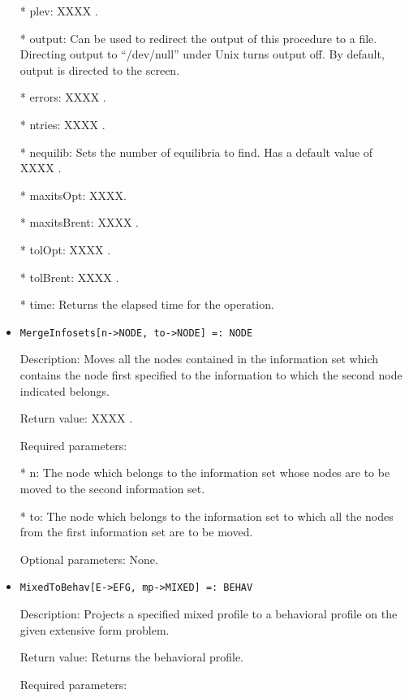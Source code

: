 \begin{itemize}
\bd
\item
[* plev:]XXXX .
\item
[* output:] Can be used to redirect the output of this procedure to a
file.  Directing output to ``/dev/null'' under Unix turns output off.
By default, output is directed to the screen.
\item
[* errors:] XXXX .
\item
[* ntries:] XXXX .
\item
[* nequilib:] Sets the number of equilibria to find.  Has a default 
value of XXXX . 
\item
[* maxitsOpt:] XXXX.
\item
[* maxitsBrent:] XXXX .
\item
[* tolOpt:] XXXX . 
\item
[* tolBrent:] XXXX .
\item
[* time:] Returns the elapsed time for the operation.
\ed
\ed

\item
\begin{verbatim}
MergeInfosets[n->NODE, to->NODE] =: NODE
\end{verbatim}

\bd
\item
[Description:] Moves all the nodes contained in the information set 
which contains the node first specified to the information to which the
second node indicated belongs.
\item
[Return value:] XXXX .
\item
[Required parameters:]\hfil\null

\bd
\item
[* n:] The node which belongs to the information set whose nodes are
to be moved to the second information set.
\item
[* to:] The node which belongs to the information set to which all
the nodes from the first information set are to be moved.
\ed

\item
[Optional parameters:] None.
\ed

\item
\begin{verbatim}
MixedToBehav[E->EFG, mp->MIXED] =: BEHAV
\end{verbatim}

\bd
\item
[Description:] Projects a specified mixed profile to a behavioral 
profile on the given extensive form problem.
\item
[Return value:] Returns the behavioral profile.
\item
[Required parameters:]\hfil\null


\end{itemize}
